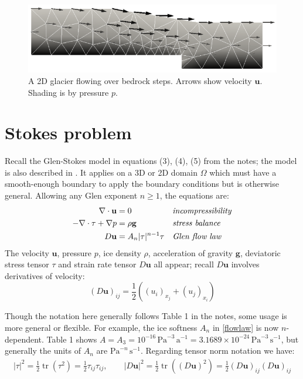 \documentclass[letterpaper,final,12pt,reqno]{amsart}
\newcommand{\trace}{\operatorname{tr}}
\newcommand{\bg}{\mathbf{g}}
\newcommand{\bu}{\mathbf{u}}
\begin{document}
\begin{figure}[h]
\includegraphics[width=\textwidth,angle=-5.7296]{stepflowlin}  %
\caption{A 2D glacier flowing over bedrock steps.  Arrows show velocity $\bu$.  Shading is by pressure $p$.}
\label{fig:glacier}
\end{figure}


\section{Stokes problem} \label{sec:stokes}

Recall the Glen-Stokes model in equations (3), (4), (5) from the notes; the model is also described in \cite{GreveBlatter2009,JouvetRappaz2011}.  It applies on a 3D or 2D domain $\Omega$ which must have a smooth-enough boundary to apply the boundary conditions but is otherwise general.  Allowing any Glen exponent $n\ge 1$, the equations are:
\begin{align}
\nabla \cdot \bu &= 0 &&\text{\emph{incompressibility}} \label{incompressible} \\
- \nabla \cdot \tau + \nabla p &= \rho \bg &&\text{\emph{stress balance}} \label{forcebalance} \\
D\bu &= A_n |\tau|^{n-1} \tau &&\text{\emph{Glen flow law}} \label{flowlaw}
\end{align}
The velocity $\bu$, pressure $p$, ice density $\rho$, acceleration of gravity $\bg$, deviatoric stress tensor $\tau$ and strain rate tensor $D\bu$ all appear; recall $D\bu$ involves derivatives of velocity:
\begin{equation}
(D\bu)_{ij} = \frac{1}{2} \left((u_i)_{x_j} + (u_j)_{x_i}\right) \label{strainrate}
\end{equation}

Though the notation here generally follows Table 1 in the notes, some usage is more general or flexible.  For example, the ice softness $A_n$ in \eqref{flowlaw} is now $n$-dependent.  Table 1 shows $A = A_3 = 10^{-16} \,\text{Pa}^{-3}\,\text{a}^{-1} = 3.1689 \times 10^{-24} \,\text{Pa}^{-3}\,\text{s}^{-1}$, but generally the units of $A_n$ are $\text{Pa}^{-n}\,\text{s}^{-1}$.  Regarding tensor norm notation we have:
\begin{align*}
|\tau|^2 = \frac{1}{2} \trace\left(\tau^2\right) = \frac{1}{2} \tau_{ij} \tau_{ij}, \qquad |D\bu|^2 = \frac{1}{2} \trace\left((D\bu)^2\right) = \frac{1}{2} (D\bu)_{ij} (D\bu)_{ij}
\end{align*}
\end{document}
